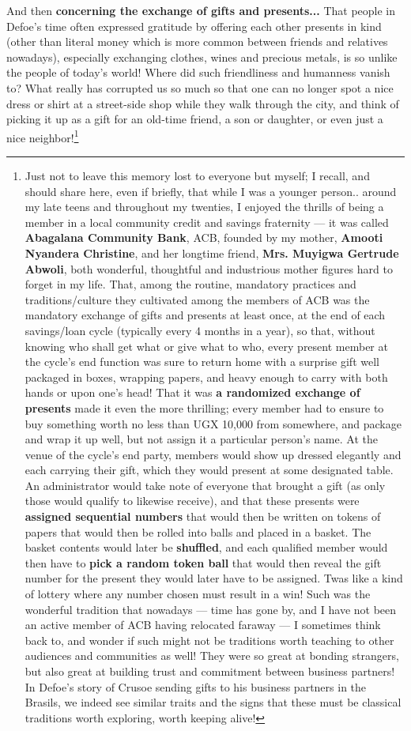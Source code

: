 \documentclass[a4paper]{article}
\begin{document}
And then \textbf{concerning the exchange of gifts and presents...} That people in Defoe's time often expressed gratitude by offering each other presents in kind (other than literal money which is more common between friends and relatives nowadays), especially exchanging clothes, wines and precious metals, is so unlike the people of today's world! Where did such friendliness and humanness vanish to? What really has corrupted us so much so that one can no longer spot a nice dress or shirt at a street-side shop while they walk through the city, and think of picking it up as a gift for an old-time friend, a son or daughter, or even just a nice neighbor!\footnote{Just not to leave this memory lost to everyone but myself; I recall, and should share here, even if briefly, that while I was a younger person.. around my late teens and throughout my twenties, I enjoyed the thrills of being a member in a local community credit and savings fraternity --- it was called \textbf{Abagalana Community Bank}, ACB, founded by my mother, \textbf{Amooti Nyandera Christine}, and her longtime friend, \textbf{Mrs. Muyigwa Gertrude Abwoli}, both wonderful, thoughtful and industrious mother figures hard to forget in my life. That, among the routine, mandatory practices and traditions/culture they cultivated among the members of ACB was the mandatory exchange of gifts and presents at least once, at the end of each savings/loan cycle (typically every 4 months in a year), so that, without knowing who shall get what or give what to who, every present member at the cycle's end function was sure to return home with a surprise gift well packaged in boxes, wrapping papers, and heavy enough to carry with both hands or upon one's head! That it was \textbf{a randomized exchange of presents} made it even the more thrilling; every member had to ensure to buy something worth no less than UGX 10,000 from somewhere, and package and wrap it up well, but not assign it a particular person's name. At the venue of the cycle's end party, members would show up dressed elegantly and each carrying their gift, which they would present at some designated table. An administrator would take note of everyone that brought a gift (as only those would qualify to likewise receive), and that these presents were \textbf{assigned sequential numbers} that would then be written on tokens of papers that would then be rolled into balls and placed in a basket. The basket contents would later be \textbf{shuffled}, and each qualified member would then have to \textbf{pick a random token ball} that would then reveal the gift number for the present they would later have to be assigned. Twas like a kind of lottery where any number chosen must result in a win! Such was the wonderful tradition that nowadays --- time has gone by, and I have not been an active member of ACB having relocated faraway --- I sometimes think back to, and wonder if such might not be traditions worth teaching to other audiences and communities as well! They were so great at bonding strangers, but also great at building trust and commitment between business partners! In Defoe's story of Crusoe sending gifts to his business partners in the Brasils, we indeed see similar traits and the signs that these must be classical traditions worth exploring, worth keeping alive!} 
\end{document}
